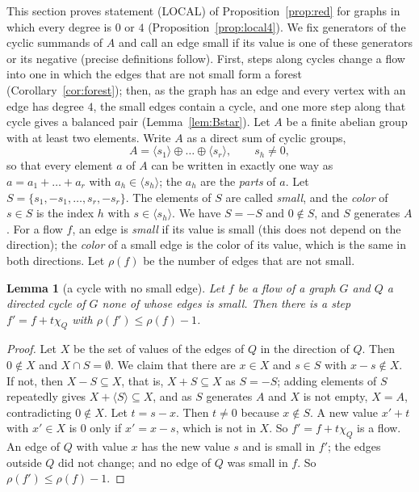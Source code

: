 \documentclass[11pt]{article}
\newtheorem{lemma}[theorem]{Lemma}
\theoremstyle{definition}
\begin{document}
This section proves statement \textup{(LOCAL)} of Proposition~\ref{prop:red} for graphs in which every
degree is $0$ or $4$ (Proposition~\ref{prop:local4}). We fix generators of the cyclic summands of $A$ and call an edge
small if its value is one of these generators or its negative (precise definitions follow). First, steps along cycles
change a flow into one in which the edges that are not small form a forest (Corollary~\ref{cor:forest}); then, as the graph has an edge and every vertex with an edge has degree $4$, the small
edges contain a cycle, and one more step along that cycle gives a balanced pair (Lemma~\ref{lem:Bstar}). Let $A$ be a finite abelian
group with at least two elements.
Write $A$ as a direct sum of cyclic groups,
\[
A=\langle s_1\rangle\oplus\dots\oplus\langle s_r\rangle,\qquad s_h\ne 0 ,
\]
so that every element $a$ of $A$ can be written in exactly one way as $a=a_1+\dots+a_r$ with $a_h\in\langle
s_h\rangle$; the $a_h$ are the \emph{parts} of $a$. Let $S=\{s_1,-s_1,\dots,s_r,-s_r\}$. The elements of $S$ are
called \emph{small}, and the \emph{color} of $s\in S$ is the index $h$ with $s\in\langle s_h\rangle$. We have $S=-S$ and $0\notin S$, and $S$ generates $A$. For a
flow $f$, an edge is \emph{small} if its value is small (this does not depend on the direction); the \emph{color} of
a small edge is the color of its value, which is the same in both directions. Let $\rho(f)$ be the number of edges
that are not small.

\begin{lemma}[a cycle with no small edge]\label{lem:Astar}
Let $f$ be a flow of a graph $G$ and $Q$ a directed cycle of $G$ none of whose edges is small. Then there is
a step $f'=f+t\chi_Q$ with $\rho(f')\le\rho(f)-1$.
\end{lemma}
\begin{proof}
Let $X$ be the set of values of the edges of $Q$ in the direction of $Q$. Then $0\notin X$
and $X\cap S=\emptyset$. We claim that there are $x\in X$ and $s\in S$ with $x-s\notin X$. If not, then $X-S\subseteq
X$, that is, $X+S\subseteq X$ as $S=-S$; adding elements of $S$ repeatedly gives $X+\langle S\rangle\subseteq X$, and as $S$ generates $A$ and $X$ is not empty,
$X=A$, contradicting $0\notin X$. Let $t=s-x$. Then $t\ne 0$ because $x\notin S$. A new value $x'+t$ with $x'\in X$ is $0$
only if $x'=x-s$, which is not in $X$. So $f'=f+t\chi_Q$ is a flow. An edge of $Q$ with value $x$ has the new
value $s$ and is small in $f'$; the edges outside $Q$ did not change; and no edge of $Q$ was small in $f$. So $\rho(f')\le\rho(f)-1$.
\end{proof}
\end{document}
